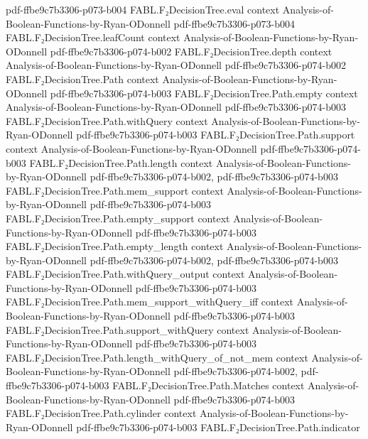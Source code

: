 \begin{theorem}
  {pdf-ffbe9c7b3306-p073-b004}
\proofstep
  {FABL.F₂DecisionTree.eval}
  {context}
  {Analysis-of-Boolean-Functions-by-Ryan-ODonnell}
  {pdf-ffbe9c7b3306-p073-b004}
\proofstep
  {FABL.F₂DecisionTree.leafCount}
  {context}
  {Analysis-of-Boolean-Functions-by-Ryan-ODonnell}
  {pdf-ffbe9c7b3306-p074-b002}
\proofstep
  {FABL.F₂DecisionTree.depth}
  {context}
  {Analysis-of-Boolean-Functions-by-Ryan-ODonnell}
  {pdf-ffbe9c7b3306-p074-b002}
\proofstep
  {FABL.F₂DecisionTree.Path}
  {context}
  {Analysis-of-Boolean-Functions-by-Ryan-ODonnell}
  {pdf-ffbe9c7b3306-p074-b003}
\proofstep
  {FABL.F₂DecisionTree.Path.empty}
  {context}
  {Analysis-of-Boolean-Functions-by-Ryan-ODonnell}
  {pdf-ffbe9c7b3306-p074-b003}
\proofstep
  {FABL.F₂DecisionTree.Path.withQuery}
  {context}
  {Analysis-of-Boolean-Functions-by-Ryan-ODonnell}
  {pdf-ffbe9c7b3306-p074-b003}
\proofstep
  {FABL.F₂DecisionTree.Path.support}
  {context}
  {Analysis-of-Boolean-Functions-by-Ryan-ODonnell}
  {pdf-ffbe9c7b3306-p074-b003}
\proofstep
  {FABL.F₂DecisionTree.Path.length}
  {context}
  {Analysis-of-Boolean-Functions-by-Ryan-ODonnell}
  {pdf-ffbe9c7b3306-p074-b002,
    pdf-ffbe9c7b3306-p074-b003}
\proofstep
  {FABL.F₂DecisionTree.Path.mem_support}
  {context}
  {Analysis-of-Boolean-Functions-by-Ryan-ODonnell}
  {pdf-ffbe9c7b3306-p074-b003}
\proofstep
  {FABL.F₂DecisionTree.Path.empty_support}
  {context}
  {Analysis-of-Boolean-Functions-by-Ryan-ODonnell}
  {pdf-ffbe9c7b3306-p074-b003}
\proofstep
  {FABL.F₂DecisionTree.Path.empty_length}
  {context}
  {Analysis-of-Boolean-Functions-by-Ryan-ODonnell}
  {pdf-ffbe9c7b3306-p074-b002,
    pdf-ffbe9c7b3306-p074-b003}
\proofstep
  {FABL.F₂DecisionTree.Path.withQuery_output}
  {context}
  {Analysis-of-Boolean-Functions-by-Ryan-ODonnell}
  {pdf-ffbe9c7b3306-p074-b003}
\proofstep
  {FABL.F₂DecisionTree.Path.mem_support_withQuery_iff}
  {context}
  {Analysis-of-Boolean-Functions-by-Ryan-ODonnell}
  {pdf-ffbe9c7b3306-p074-b003}
\proofstep
  {FABL.F₂DecisionTree.Path.support_withQuery}
  {context}
  {Analysis-of-Boolean-Functions-by-Ryan-ODonnell}
  {pdf-ffbe9c7b3306-p074-b003}
\proofstep
  {FABL.F₂DecisionTree.Path.length_withQuery_of_not_mem}
  {context}
  {Analysis-of-Boolean-Functions-by-Ryan-ODonnell}
  {pdf-ffbe9c7b3306-p074-b002,
    pdf-ffbe9c7b3306-p074-b003}
\proofstep
  {FABL.F₂DecisionTree.Path.Matches}
  {context}
  {Analysis-of-Boolean-Functions-by-Ryan-ODonnell}
  {pdf-ffbe9c7b3306-p074-b003}
\proofstep
  {FABL.F₂DecisionTree.Path.cylinder}
  {context}
  {Analysis-of-Boolean-Functions-by-Ryan-ODonnell}
  {pdf-ffbe9c7b3306-p074-b003}
\proofstep
  {FABL.F₂DecisionTree.Path.indicator}

\end{theorem}
